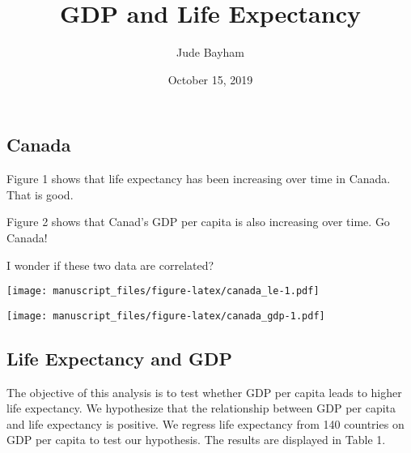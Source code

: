 \documentclass[]{article}
\title{GDP and Life Expectancy}
\author{Jude Bayham}
\date{October 15, 2019}
\begin{document}
\maketitle

\hypertarget{canada}{%
\subsection{Canada}\label{canada}}

Figure 1 shows that life expectancy has been increasing over time in
Canada. That is good.

Figure 2 shows that Canad's GDP per capita is also increasing over time.
Go Canada!

I wonder if these two data are correlated?

\texttt{[image: manuscript\_files/figure-latex/canada\_le-1.pdf]}

\texttt{[image: manuscript\_files/figure-latex/canada\_gdp-1.pdf]}

\hypertarget{life-expectancy-and-gdp}{%
\subsection{Life Expectancy and GDP}\label{life-expectancy-and-gdp}}

The objective of this analysis is to test whether GDP per capita leads
to higher life expectancy. We hypothesize that the relationship between
GDP per capita and life expectancy is positive. We regress life
expectancy from 140 countries on GDP per capita to test our hypothesis.
The results are displayed in Table 1.
\end{document}
